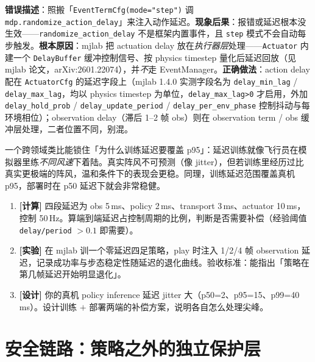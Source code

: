 \begin{pitfall}
\textbf{错误描述}：照搬「\texttt{EventTermCfg(mode="step")} 调 \texttt{mdp.randomize\_action\_delay}」来注入动作延迟。\textbf{现象后果}：报错或延迟根本没生效——\texttt{randomize\_action\_delay} 不是框架内置事件，且 \texttt{step} 模式不会自动每步触发。\textbf{根本原因}：mjlab 把 actuation delay 放在\emph{执行器层}处理——\texttt{Actuator} 内建一个 \texttt{DelayBuffer} 缓冲控制信号、按 physics timestep 量化后延迟回放（见 mjlab 论文，arXiv:2601.22074），并\emph{不}走 EventManager。\textbf{正确做法}：action delay 配在 \verb|ActuatorCfg| 的延迟字段上（mjlab 1.4.0 实测字段名为 \verb|delay_min_lag| / \verb|delay_max_lag|，均以 physics timestep 为单位，\verb|delay_max_lag>0| 才启用，外加 \verb|delay_hold_prob| / \verb|delay_update_period| / \verb|delay_per_env_phase| 控制抖动与每环境相位）；observation delay（滞后 1--2 帧 obs）则在 observation term / obs 缓冲层处理，二者位置不同，别混。
\end{pitfall}

一个跨领域类比能锁住「为什么训练延迟要覆盖 p95」：延迟训练就像飞行员在模拟器里练\emph{不同风速}下着陆。真实阵风不可预测（像 jitter），但若训练里经历过比真实更极端的阵风，温和条件下的表现会更稳。同理，训练延迟范围覆盖真机 p95，部署时在 p50 延迟下就会非常稳健。

\begin{practice}[延迟动手]
\begin{enumerate}
  \item \textbf{[计算]} 四段延迟为 obs 5\,ms、policy 2\,ms、transport 3\,ms、actuator 10\,ms，控制 50\,Hz。算端到端延迟占控制周期的比例，判断是否需要补偿（经验阈值 \texttt{delay/period} $>0.1$ 即需要）。
  \item \textbf{[实验]} 在 mjlab 训一个零延迟四足策略，play 时注入 1/2/4 帧 observation 延迟，记录成功率与步态稳定性随延迟的退化曲线。验收标准：能指出「策略在第几帧延迟开始明显退化」。
  \item \textbf{[设计]} 你的真机 policy inference 延迟 jitter 大（p50=2、p95=15、p99=40\,ms）。设计训练 $+$ 部署两端的补偿方案，说明各自怎么处理尖峰。
\end{enumerate}
\end{practice}

\section{安全链路：策略之外的独立保护层}
\label{sec:rlmc-s2r-safety}

